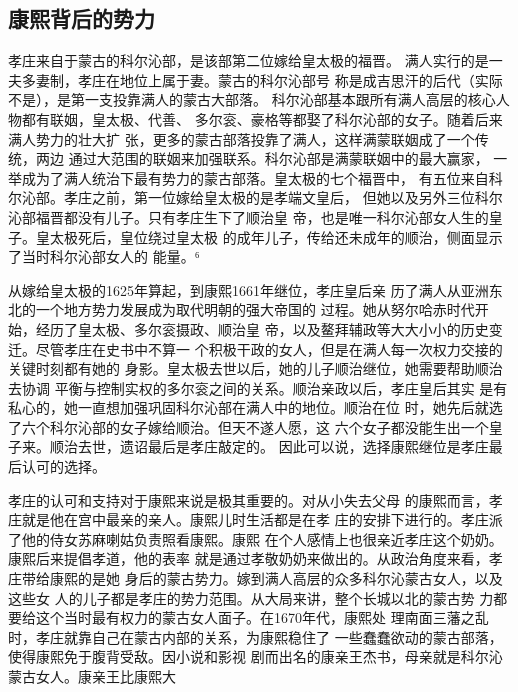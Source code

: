 \subsection{康熙背后的势力}
\par
孝庄来自于蒙古的科尔沁部，是该部第二位嫁给皇太极的福晋。%
满人实行的是一夫多妻制，孝庄在地位上属于妻。蒙古的科尔沁部号%
称是成吉思汗的后代（实际不是），是第一支投靠满人的蒙古大部落。%
科尔沁部基本跟所有满人高层的核心人物都有联姻，皇太极、代善、%
多尔衮、豪格等都娶了科尔沁部的女子。随着后来满人势力的壮大扩%
张，更多的蒙古部落投靠了满人，这样满蒙联姻成了一个传统，两边%
通过大范围的联姻来加强联系。科尔沁部是满蒙联姻中的最大赢家，%
一举成为了满人统治下最有势力的蒙古部落。皇太极的七个福晋中，%
有五位来自科尔沁部。孝庄之前，第一位嫁给皇太极的是孝端文皇后，%
但她以及另外三位科尔沁部福晋都没有儿子。只有孝庄生下了顺治皇%
帝，也是唯一科尔沁部女人生的皇子。皇太极死后，皇位绕过皇太极%
的成年儿子，传给还未成年的顺治，侧面显示了当时科尔沁部女人的%
能量。⁶%
\par
从嫁给皇太极的1625年算起，到康熙1661年继位，孝庄皇后亲%
历了满人从亚洲东北的一个地方势力发展成为取代明朝的强大帝国的%
过程。她从努尔哈赤时代开始，经历了皇太极、多尔衮摄政、顺治皇%
帝，以及鳌拜辅政等大大小小的历史变迁。尽管孝庄在史书中不算一%
个积极干政的女人，但是在满人每一次权力交接的关键时刻都有她的%
身影。皇太极去世以后，她的儿子顺治继位，她需要帮助顺治去协调%
平衡与控制实权的多尔衮之间的关系。顺治亲政以后，孝庄皇后其实%
是有私心的，她一直想加强巩固科尔沁部在满人中的地位。顺治在位%
时，她先后就选了六个科尔沁部的女子嫁给顺治。但天不遂人愿，这%
六个女子都没能生出一个皇子来。顺治去世，遗诏最后是孝庄敲定的。%
因此可以说，选择康熙继位是孝庄最后认可的选择。%
\par
孝庄的认可和支持对于康熙来说是极其重要的。对从小失去父母%
的康熙而言，孝庄就是他在宫中最亲的亲人。康熙儿时生活都是在孝%
庄的安排下进行的。孝庄派了他的侍女苏麻喇姑负责照看康熙。康熙%
在个人感情上也很亲近孝庄这个奶奶。康熙后来提倡孝道，他的表率%
就是通过孝敬奶奶来做出的。从政治角度来看，孝庄带给康熙的是她%
身后的蒙古势力。嫁到满人高层的众多科尔沁蒙古女人，以及这些女%
人的儿子都是孝庄的势力范围。从大局来讲，整个长城以北的蒙古势%
力都要给这个当时最有权力的蒙古女人面子。在1670年代，康熙处%
理南面三藩之乱时，孝庄就靠自己在蒙古内部的关系，为康熙稳住了%
一些蠢蠢欲动的蒙古部落，使得康熙免于腹背受敌。因小说和影视%
剧而出名的康亲王杰书，母亲就是科尔沁蒙古女人。康亲王比康熙大%
